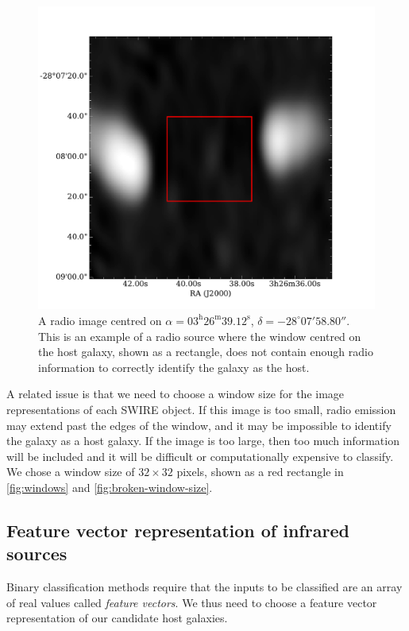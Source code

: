 \documentclass[fleqn,usenatbib,usedcolumn]{mnras}
\begin{document}
    \begin{figure}
      \centering
      \includegraphics[width=0.75\linewidth]{images/ARG0003sky_radio}
      \caption{A radio image centred on $\alpha =
        03^\text{h}26^\text{m}39.12^\text{s}$, $\delta = -28^\circ{}07'58.80''$.        %
        This is an example of a radio source where the window centred on the
        host galaxy, shown as a rectangle, does not contain enough radio
        information to correctly identify the galaxy as the host.}
      \label{fig:broken-window-size}
    \end{figure}

    A related issue is that we need to choose a window size for the image
    representations of each SWIRE object. If this image is too small, radio
    emission may extend past the edges of the window, and it may be impossible
    to identify the galaxy as a host galaxy. If the image is too large, then
    too much information will be included and it will be difficult or
    computationally expensive to classify. We chose a window size of $32
    \times 32$ pixels, shown as a red rectangle in
    \autoref{fig:windows} and \autoref{fig:broken-window-size}.

  \subsection{Feature vector representation of infrared sources}
  \label{vector-representation-of-infrared-sources}

    Binary classification methods require that the inputs to be classified
    are an array of real values called \emph{feature vectors}. We thus need to
    choose a feature vector representation of our candidate host galaxies.
\end{document}
